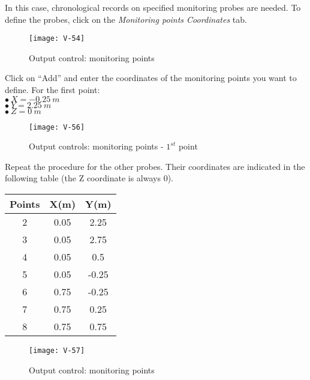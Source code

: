 \newpage
In this case, chronological records on specified monitoring probes are needed.
To define the probes, click on the
{\itshape Monitoring points Coordinates} tab.

\begin{figure}[h!]
\begin{center}
\texttt{[image: V-54]}
\caption{Output control: monitoring points}
\label{fig25_e2}
\end{center}
\end{figure}



\newpage
Click on ``Add'' and enter the coordinates of the monitoring points you want to define. For the first point:\\
\hspace*{1cm}$\bullet\ X = -0.25\ m$\\
\hspace*{1cm}$\bullet\ Y = 2.25\ m$\\
\hspace*{1cm}$\bullet\ Z = 0\ m$


\begin{figure}[h!]
\begin{center}
\texttt{[image: V-56]}
\caption{Output controls: monitoring points - $1^{st}$ point}
\label{fig27_e2}
\end{center}
\end{figure}


\newpage
Repeat the procedure for the other probes. Their coordinates are indicated in
the following table (the Z coordinate is always 0).
\begin{center}
\begin{tabular}{|c|c|c|}
\hline
Points & X(m) & Y(m) \\
\hline
2 & 0.05 & 2.25 \\
\hline
3 & 0.05 & 2.75 \\
\hline
4 & 0.05 & 0.5 \\
\hline
5 & 0.05 & -0.25 \\
\hline
6 & 0.75 & -0.25 \\
\hline
7 & 0.75 & 0.25 \\
\hline
8 & 0.75 & 0.75 \\
\hline
\end{tabular}
\end{center}

\begin{figure}[h!]
\begin{center}
\texttt{[image: V-57]}
\caption{Output control: monitoring points}
\label{fig28_e2}
\end{center}
\end{figure}

